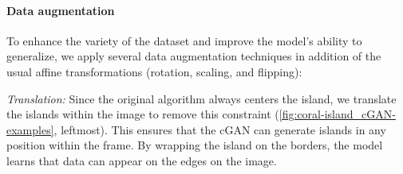 
\paragraph{Data augmentation}


To enhance the variety of the dataset and improve the model's ability to generalize, we apply several data augmentation techniques in addition of the usual affine transformations (rotation, scaling, and flipping):

        \textit{Translation:} Since the original algorithm always centers the island, we translate the islands within the image to remove this constraint (\cref{fig:coral-island_cGAN-examples}, leftmost). This ensures that the cGAN can generate islands in any position within the frame. By wrapping the island on the borders, the model learns that data can appear on the edges on the image.


